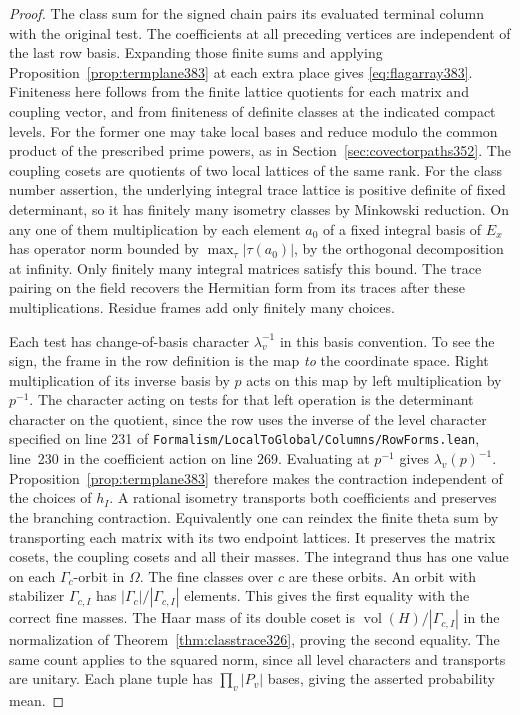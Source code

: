 \documentclass[a4paper,11pt]{article}
\theoremstyle{definition}
\theoremstyle{remark}
\newcommand{\srcloc}[2]{{\small\nolinkurl{#1.lean}}, line~#2}
\numberwithin{equation}{section}
\begin{document}
\begin{proof}
The class sum for the signed chain pairs its evaluated terminal
column with the original test. The coefficients at all preceding
vertices are independent of the last row basis. Expanding those
finite sums and applying Proposition~\ref{prop:termplane383}
at each extra place gives \eqref{eq:flagarray383}. Finiteness
here follows from the finite lattice quotients for each matrix
and coupling vector, and from finiteness of definite classes
at the indicated compact levels. For the former one may take
local bases and reduce modulo the common product of the prescribed
prime powers, as in Section~\ref{sec:covectorpaths352}. The
coupling cosets are quotients of two local lattices of the same
rank. For the class number assertion, the underlying integral trace
lattice is positive definite of fixed determinant, so it has
finitely many isometry classes by Minkowski reduction. On
any one of them multiplication by each element \(a_0\) of a
fixed integral basis of \(E_x\) has operator norm bounded by
\(\max_\tau|\tau(a_0)|\), by the orthogonal decomposition at
infinity. Only finitely many integral matrices satisfy this
bound. The trace pairing on the field recovers the Hermitian
form from its traces after these multiplications. Residue
frames add only finitely many choices.

Each test has change-of-basis character \(\lambda_v^{-1}\) in
this basis convention. To see the sign, the frame in the row
definition is the map \emph{to} the coordinate space. Right
multiplication of its inverse basis by \(p\) acts on this map by
left multiplication by \(p^{-1}\). The character acting on tests
for that left operation is the determinant character on the
quotient, since the row uses the inverse of the level character
specified on line 231 of
\srcloc{Formalism/LocalToGlobal/Columns/RowForms}{230}
in the coefficient action on line 269. Evaluating at
\(p^{-1}\) gives \(\lambda_v(p)^{-1}\). Proposition~\ref{prop:termplane383}
therefore makes the contraction independent of the choices of
\(h_I\). A rational isometry transports both coefficients and
preserves the branching contraction. Equivalently one can
reindex the finite theta sum by transporting each matrix with
its two endpoint lattices. It preserves the matrix cosets, the
coupling cosets and all their masses. The integrand thus has
one value on each \(\Gamma_c\)-orbit in \(\Omega\). The fine
classes over \(c\) are these orbits. An orbit with stabilizer
\(\Gamma_{c,I}\) has \(|\Gamma_c|/|\Gamma_{c,I}|\) elements.
This gives the first equality with the correct fine masses.
The Haar mass of its double coset is
\(\operatorname{vol}(H)/|\Gamma_{c,I}|\) in the normalization
of Theorem~\ref{thm:classtrace326}, proving the second equality.
The same count applies to the squared norm, since all level
characters and transports are unitary. Each plane tuple has
\(\prod_v |P_v|\) bases, giving the asserted probability mean.
\end{proof}
\end{document}
